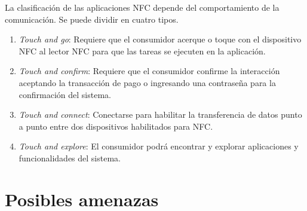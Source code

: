 \documentclass[12pt,a4paper,onecolumn,oneside]{report}
\begin{document}
La clasificación de las aplicaciones NFC depende del comportamiento de la comunicación. Se puede dividir en cuatro tipos.

\begin{enumerate}

\item \textit{Touch and go}: Requiere que el consumidor acerque o toque con el dispositivo NFC al lector NFC para que las tareas se ejecuten en la aplicación. 
\item \textit{Touch and confirm}: Requiere que el consumidor confirme la interacción aceptando la transacción de pago o ingresando una contraseña para la confirmación del sistema.
\item \textit{Touch and connect}: Conectarse para habilitar la transferencia de datos punto a punto entre dos dispositivos habilitados para NFC. 
\item \textit{Touch and explore}: El consumidor podrá encontrar y explorar aplicaciones y funcionalidades del sistema.

\end{enumerate}


\section*{Posibles amenazas}
\end{document}
